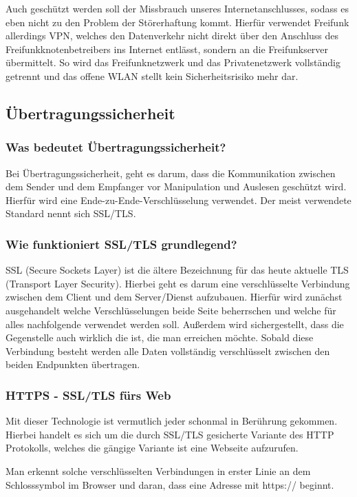 Auch geschützt werden soll der Missbrauch unseres Internetanschlusses, sodass 
es eben nicht zu den Problem der Störerhaftung kommt. Hierfür verwendet Freifunk 
allerdings VPN, welches den Datenverkehr nicht direkt über den Anschluss des 
Freifunkknotenbetreibers ins Internet entlässt, sondern an die Freifunkserver 
übermittelt. So wird das Freifunknetzwerk und das Privatenetzwerk vollständig 
getrennt und das offene WLAN stellt kein Sicherheitsrisiko mehr dar. 


\subsection{Übertragungssicherheit}
\subsubsection{Was bedeutet Übertragungssicherheit?}
Bei Übertragungssicherheit, geht es darum, dass die Kommunikation zwischen dem 
Sender und dem Empfanger vor Manipulation und Auslesen geschützt wird. Hierfür 
wird eine Ende-zu-Ende-Verschlüsselung verwendet. Der meist verwendete 
Standard nennt sich SSL/TLS.

\subsubsection{Wie funktioniert SSL/TLS grundlegend?}
SSL (Secure Sockets Layer) ist die ältere Bezeichnung für das heute aktuelle 
TLS (Transport Layer Security). Hierbei geht es darum eine verschlüsselte 
Verbindung zwischen dem Client und dem Server/Dienst aufzubauen. Hierfür wird 
zunächst ausgehandelt welche Verschlüsselungen beide Seite beherrschen und 
welche für alles nachfolgende verwendet werden soll. Außerdem wird 
sichergestellt, dass die Gegenstelle auch wirklich die ist, die man erreichen 
möchte. Sobald diese Verbindung besteht werden alle Daten vollständig 
verschlüsselt zwischen den beiden Endpunkten übertragen. 

\subsubsection{HTTPS - SSL/TLS fürs Web}
Mit dieser Technologie ist vermutlich jeder schonmal in Berührung gekommen. 
Hierbei handelt es sich um die durch SSL/TLS gesicherte Variante des HTTP 
Protokolls, welches die gängige Variante ist eine Webseite aufzurufen. 

Man erkennt solche verschlüsselten Verbindungen in erster Linie an dem 
Schlosssymbol im Browser und daran, dass eine Adresse mit https:// beginnt.

